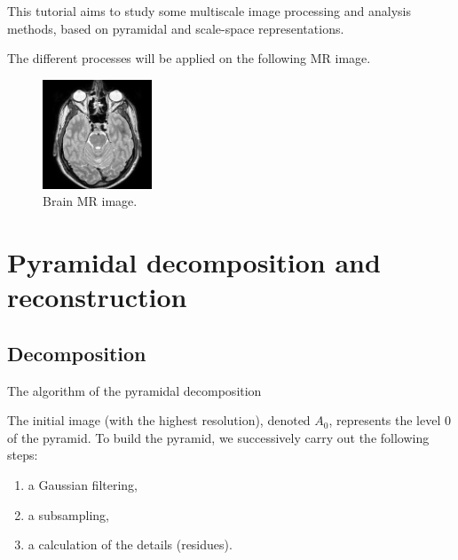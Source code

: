 \def\difficulty{1}
\label{lbl:tutorial:multiscale}

\begin{note}This tutorial aims to study some multiscale image processing and analysis methods, based on pyramidal and scale-space representations.\end{note}

\noindent The different processes will be applied on the following MR image.
\begin{figure}[h]
\begin{center}
\includegraphics[width=3.25cm]{cerveau.jpg}
\caption{Brain MR image.}
\end{center}
\vspace*{-8pt}
\end{figure}

\vspace*{-12pt}

\section{Pyramidal decomposition and re\-cons\-truc\-tion}

\vspace*{-4pt}
\subsection{Decomposition}


\begin{algorithm}[H]
\SetAlgoLined
{}
\caption{The algorithm of the pyramidal decomposition}
\end{algorithm}

The initial image (with the highest resolution), denoted $A_0$, represents the level 0 of the pyramid.
To build the pyramid, we successively carry out the following steps:
\begin{enumerate}
	\item a Gaussian filtering,
	\item a subsampling,
	\item a calculation of the details (residues).
\end{enumerate}

